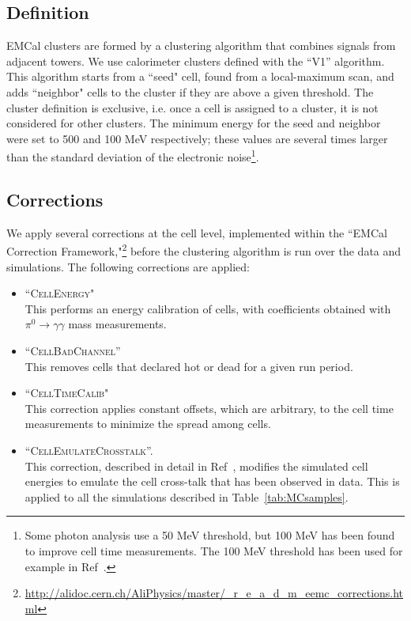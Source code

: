 \subsection{Definition}
EMCal clusters are formed by a clustering algorithm that combines signals from adjacent towers. We use calorimeter clusters defined with the ``V1'' algorithm. This algorithm starts from a ``seed" cell, found from a local-maximum scan, and adds ``neighbor" cells to the cluster if they are above a given threshold. The cluster definition is exclusive, i.e. once a cell is assigned to a cluster, it is not considered for other clusters. The minimum energy for the seed and neighbor were set to 500 and 100 MeV respectively; these values are several times larger than the standard deviation of the electronic noise\footnote{Some photon analysis use a 50 MeV threshold, but 100 MeV has been found to improve cell time measurements. The 100 MeV threshold has been used for example in Ref~\cite{Acharya:2017tlv}.}.

\subsection{Corrections}
We apply several corrections at the cell level, implemented within the ``EMCal Correction Framework,"\footnote{\url{http://alidoc.cern.ch/AliPhysics/master/_r_e_a_d_m_eemc_corrections.html} } before the clustering algorithm is run over the data and simulations. The following corrections are applied: 
\begin{itemize}
\item ``\textsc{CellEnergy}"\\
This performs an energy calibration of cells, with coefficients obtained with $\pi^{0}\to\gamma\gamma$ mass measurements.
\item ``\textsc{CellBadChannel}''\\
This removes cells that declared hot or dead for a given run period. 
\item ``\textsc{CellTimeCalib}"\\
This correction applies constant offsets, which are arbitrary, to the cell time measurements to minimize the spread among cells. 
\item ``\textsc{CellEmulateCrosstalk}''. \\
This correction, described in detail in Ref~\cite{CrossTalk}, modifies the simulated cell energies to emulate the cell cross-talk that has been observed in data. This is applied to all the simulations described in Table~\ref{tab:MCsamples}. 
\end{itemize}


